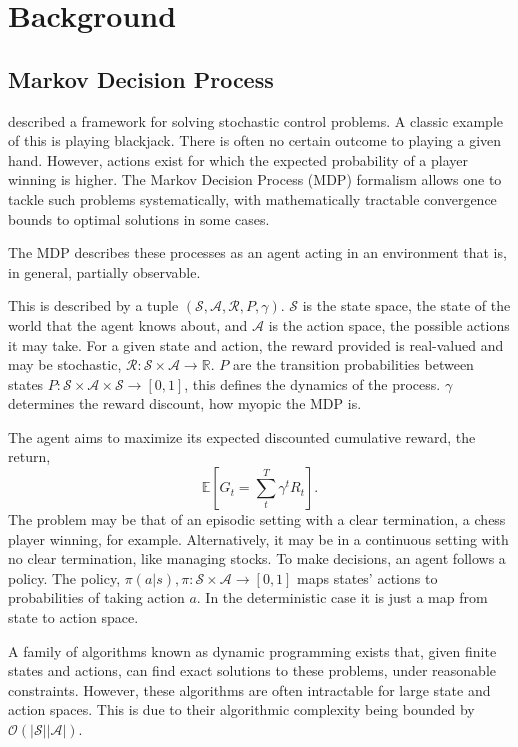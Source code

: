 
\chapter{Background}\label{chap:background}
\section{Markov Decision Process}

\cite{bellamn1957mdp} described a framework for solving stochastic control problems. A classic example of this is playing blackjack. There is often no certain outcome to playing a given hand. However, actions exist for which the expected probability of a player winning is higher. The Markov Decision Process (MDP) formalism allows one to tackle such problems systematically, with mathematically tractable convergence bounds to optimal solutions in some cases.

The MDP describes these processes as an agent acting in an environment that is, in general, partially observable.

This is described by a tuple $(\mathcal{S}, \mathcal{A}, \mathcal{R}, P, \gamma)$. $\mathcal{S}$ is the state space, the state of the world that the agent knows about, and $\mathcal{A}$ is the action space, the possible actions it may take. For a given state and action, the reward provided is real-valued and may be stochastic, $\mathcal{R}: \mathcal{S} \times \mathcal{A} \rightarrow \mathbb{R}$. $P$ are the transition probabilities between states $P: \mathcal{S} \times \mathcal{A} \times \mathcal{S} \rightarrow [0, 1]$, this defines the dynamics of the process. $\gamma $ determines the reward discount, how myopic the MDP is.

The agent aims to maximize its expected discounted cumulative reward, the return,
\begin{equation}
	\mathbb{E} [ G_t = \sum_t^T \gamma^t R_t ] .
\end{equation}
The problem may be that of an episodic setting with a clear termination, a chess player winning, for example. Alternatively, it may be in a continuous setting with no clear termination, like managing stocks. To make decisions, an agent follows a policy. The policy, $\pi(a|s), \pi: \mathcal{S} \times \mathcal{A} \rightarrow [0, 1]$ maps states' actions to probabilities of taking action $a$. In the deterministic case it is just a map from state to action space.


A family of algorithms known as dynamic programming exists that, given finite states and actions, can find exact solutions to these problems, under reasonable constraints. However, these algorithms are often intractable for large state and action spaces. This is due to their algorithmic complexity being bounded by $\mathcal{O}(|\mathcal{S}||\mathcal{A}|)$.

